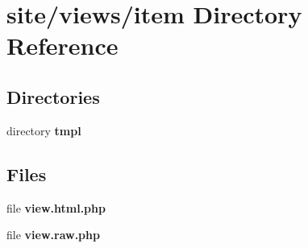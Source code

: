 \section{site/views/item Directory Reference}
\label{dir_96e593d5bf5f554b4ff75cf582bbdf68}
\subsection*{Directories}
\begin{DoxyCompactItemize}
\item 
directory \textbf{ tmpl}
\end{DoxyCompactItemize}
\subsection*{Files}
\begin{DoxyCompactItemize}
\item 
file \textbf{ view.\+html.\+php}
\item 
file \textbf{ view.\+raw.\+php}
\end{DoxyCompactItemize}
